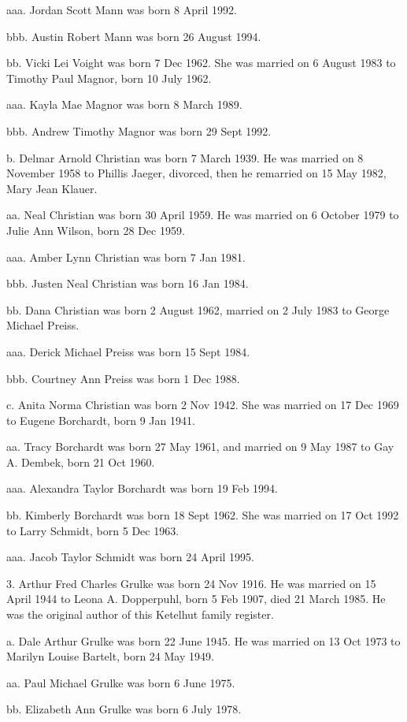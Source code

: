 \documentclass[a4paper]{article}
\begin{document}
aaa. Jordan Scott Mann was born 8 April 1992.

bbb. Austin Robert Mann was born 26 August 1994.
				
bb. Vicki Lei Voight was born 7 Dec 1962.  She was married on 6 August 1983 to Timothy Paul Magnor, born 10 July 1962.

aaa. Kayla Mae Magnor was born 8 March 1989.

bbb. Andrew Timothy Magnor was born 29 Sept 1992.

b. Delmar Arnold Christian was born 7 March 1939.  He was married on 8 November 1958 to Phillis Jaeger, divorced, then he remarried on 15 May 1982, Mary Jean Klauer.

aa. Neal Christian was born 30 April 1959.  He was married on 6 October 1979 to Julie Ann Wilson, born 28 Dec 1959.

aaa. Amber Lynn Christian was born 7 Jan 1981.

bbb. Justen Neal Christian was born 16 Jan 1984.

bb. Dana Christian was born 2 August 1962, married on 2 July 1983 to George Michael Preiss.

aaa. Derick Michael Preiss was born 15 Sept 1984.

bbb. Courtney Ann Preiss was born 1 Dec 1988.

c. Anita Norma Christian was born 2 Nov 1942.  She was married on 17 Dec 1969 to Eugene Borchardt, born 9 Jan 1941. 

aa. Tracy Borchardt was born 27 May 1961,  and married on 9 May 1987 to Gay A. Dembek, born 21 Oct 1960.

aaa. Alexandra Taylor Borchardt was born 19 Feb 1994.

bb. Kimberly Borchardt was born 18 Sept 1962.  She was married on 17 Oct 1992 to Larry Schmidt, born 5 Dec 1963.

aaa. Jacob Taylor Schmidt was born 24 April 1995.

3.  Arthur Fred Charles Grulke was born 24 Nov 1916.  He was married on 15 April 1944 to Leona A. Dopperpuhl, born 5 Feb 1907, died 21 March 1985.  He was the original author of this Ketelhut family register.

a. Dale Arthur Grulke was born 22 June 1945.  He was married on 13 Oct 1973 to Marilyn Louise Bartelt, born 24 May 1949.

aa. Paul Michael Grulke was born 6 June 1975.

bb. Elizabeth Ann Grulke was born 6 July 1978.
\end{document}
